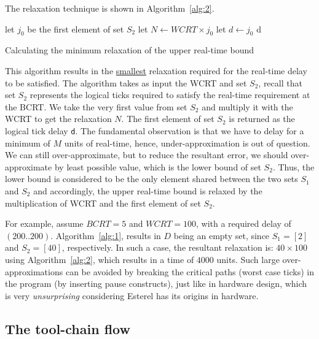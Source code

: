 The relaxation technique is shown in Algorithm~\ref{alg:2}.
  
\begin{algorithm}[t!]
  \begin{minipage}{1.0\linewidth}
    \SetAlgoLined
     {
      let $j_{0}$ be the first element of set $S_2$\;
      \ShowLn let $N \leftarrow WCRT \times j_0$\;
      let $d \leftarrow j_0$\;
    }
    \Return d\;
    \caption{Calculating the minimum relaxation of the upper real-time
      bound}
    \label{alg:2}
  \end{minipage}
\end{algorithm}


This algorithm results in the \underline{smallest} relaxation required
for the real-time delay to be satisfied. The algorithm takes as input
the WCRT and set $S_2$, recall that set $S_2$ represents the logical
ticks required to satisfy the real-time requirement at the BCRT. We take
the very first value from set $S_2$ and multiply it with the WCRT to get
the relaxation $N$. The first element of set $S_2$ is returned as the
logical tick delay \texttt{d}. The fundamental observation is that we
have to delay for a minimum of $M$ units of real-time, hence,
under-approximation is out of question. We can still over-approximate,
but to reduce the resultant error, we should over-approximate by least
possible value, which is the lower bound of set $S_2$. Thus, the lower
bound is considered to be the only element shared between the two sets
$S_1$ and $S_2$ and accordingly, the upper real-time bound is relaxed by
the multiplication of WCRT and the first element of set $S_2$.

For example, assume $BCRT=5$ and $WCRT=100$, with a required delay of
$(200..200)$. Algorithm~\ref{alg:1}, results in $D$ being an empty set,
since $S_1=[2]$ and $S_2=[40]$, respectively. In such a case, the
resultant relaxation is: $40 \times 100$ using Algorithm~\ref{alg:2},
which results in a time of $4000$ units. Such large over-approximations
can be avoided by breaking the critical paths (worst case ticks) in the
program (by inserting pause constructs), just like in hardware design,
which is very \textit{unsurprising} considering Esterel has its origins
in hardware.

\subsection{The tool-chain flow}
\label{sec:tool-chain-flow}

